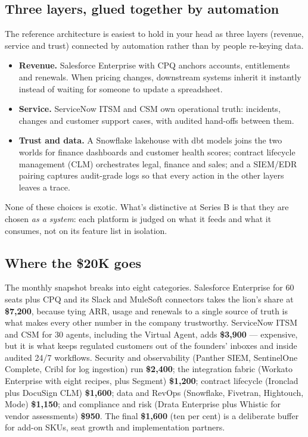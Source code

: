 \subsection{Three layers, glued together by automation}


The reference architecture is easiest to hold in your head as three layers (revenue, service and trust) connected by automation rather than by people re-keying data.


\begin{itemize}[leftmargin=*]
\item \textbf{Revenue.} Salesforce Enterprise with CPQ anchors accounts, entitlements and renewals. When pricing changes, downstream systems inherit it instantly instead of waiting for someone to update a spreadsheet.
\item \textbf{Service.} ServiceNow ITSM and CSM own operational truth: incidents, changes and customer support cases, with audited hand-offs between them.
\item \textbf{Trust and data.} A Snowflake lakehouse with dbt models joins the two worlds for finance dashboards and customer health scores; contract lifecycle management (CLM) orchestrates legal, finance and sales; and a SIEM/EDR pairing captures audit-grade logs so that every action in the other layers leaves a trace.
\end{itemize}

None of these choices is exotic. What's distinctive at Series B is that they are chosen \emph{as a system}: each platform is judged on what it feeds and what it consumes, not on its feature list in isolation.



\subsection{Where the \$20K goes}


The monthly snapshot breaks into eight categories. Salesforce Enterprise for 60 seats plus CPQ and its Slack and MuleSoft connectors takes the lion's share at \textbf{\$7,200}, because tying ARR, usage and renewals to a single source of truth is what makes every other number in the company trustworthy. ServiceNow ITSM and CSM for 30 agents, including the Virtual Agent, adds \textbf{\$3,900} — expensive, but it is what keeps regulated customers out of the founders' inboxes and inside audited 24/7 workflows. Security and observability (Panther SIEM, SentinelOne Complete, Cribl for log ingestion) run \textbf{\$2,400}; the integration fabric (Workato Enterprise with eight recipes, plus Segment) \textbf{\$1,200}; contract lifecycle (Ironclad plus DocuSign CLM) \textbf{\$1,600}; data and RevOps (Snowflake, Fivetran, Hightouch, Mode) \textbf{\$1,150}; and compliance and risk (Drata Enterprise plus Whistic for vendor assessments) \textbf{\$950}. The final \textbf{\$1,600} (ten per cent) is a deliberate buffer for add-on SKUs, seat growth and implementation partners.


